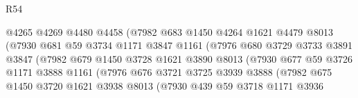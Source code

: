 \begin{lexlean}{R54}
\begin{coremodule}
                                @4265
                                @4269
                                @4480
                                @4458
                                (@7982
                                  @683
                                  @1450
                                  @4264
                                  @1621
                                  @4479
                                  @8013
                                  (@7930
                                    @681
                                    @59
                                    @3734
                                    @1171
                                    @3847
                                    @1161
                                    (@7976
                                      @680
                                      @3729
                                      @3733
                                      @3891
                                      @3847
                                      (@7982
                                        @679
                                        @1450
                                        @3728
                                        @1621
                                        @3890
                                        @8013
                                        (@7930
                                          @677
                                          @59
                                          @3726
                                          @1171
                                          @3888
                                          @1161
                                          (@7976
                                            @676
                                            @3721
                                            @3725
                                            @3939
                                            @3888
                                            (@7982
                                              @675
                                              @1450
                                              @3720
                                              @1621
                                              @3938
                                              @8013
                                              (@7930
                                                @439
                                                @59
                                                @3718
                                                @1171
                                                @3936

\end{coremodule}
\end{lexlean}
